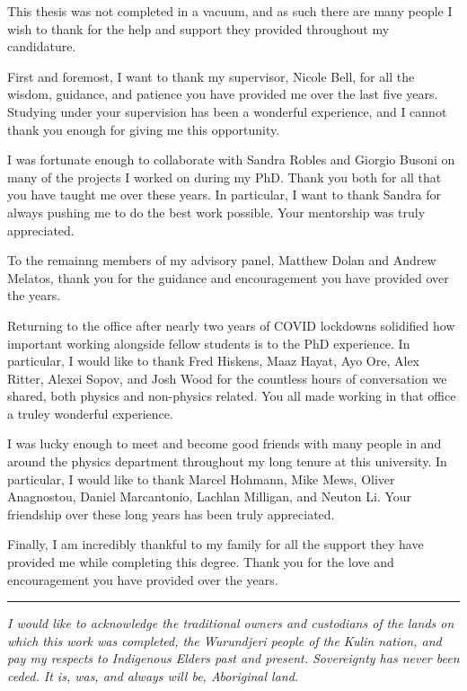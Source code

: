 \begin{acknowledgements}

  This thesis was not completed in a vacuum, and as such there are many people I wish to thank for the help and support they provided throughout my candidature.

  First and foremost, I want to thank my supervisor, Nicole Bell, for all the wisdom, guidance, and patience you have provided me over the last five years. Studying under your supervision has been a wonderful experience, and I cannot thank you enough for giving me this opportunity.

  I was fortunate enough to collaborate with Sandra Robles and Giorgio Busoni on many of the projects I worked on during my PhD. Thank you both for all that you have taught me over these years. In particular, I want to thank Sandra for always pushing me to do the best work possible. Your mentorship was truly appreciated.

  To the remainng members of my advisory panel, Matthew Dolan and Andrew Melatos, thank you for the guidance and encouragement you have provided over the years.

  Returning to the office after nearly two years of COVID lockdowns solidified how important working alongside fellow students is to the PhD experience. In particular, I would like to thank Fred Hiskens, Maaz Hayat, Ayo Ore, Alex Ritter, Alexei Sopov, and Josh Wood for the countless hours of conversation we shared, both physics and non-physics related. You all made working in that office a truley wonderful experience.
 
  I was lucky enough to meet and become good friends with many people in and around the physics department throughout my long tenure at this university. In particular, I would like to thank Marcel Hohmann, Mike Mews, Oliver Anagnostou, Daniel Marcantonio, Lachlan Milligan, and Neuton Li. Your friendship over these long years has been truly appreciated.

  Finally, I am incredibly thankful to my family for all the support they have provided me while completing this degree. Thank you for the love and encouragement you have provided over the years. 

  \vfill
  \noindent\rule{\textwidth}{0.5pt}
  \textit{I would like to acknowledge the traditional owners and custodians of the lands on which this work was completed, the Wurundjeri people of the Kulin nation, and pay my respects to Indigenous Elders past and present. Sovereignty has never been ceded. It is, was, and always will be, Aboriginal land.}
\end{acknowledgements}
